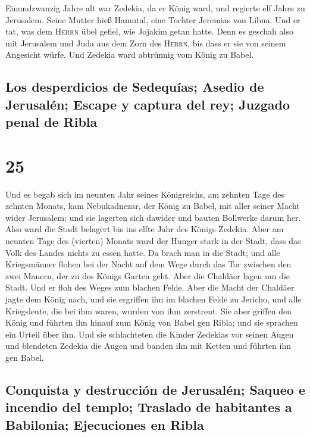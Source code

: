  Einundzwanzig Jahre alt war Zedekia, da er König ward,
und regierte elf Jahre zu Jerusalem. Seine Mutter hieß Hamutal, eine
Tochter Jeremias von Libna.  Und er tat, was dem
\textsc{Herrn} übel gefiel, wie Jojakim getan hatte. 
Denn es geschah also mit Jerusalem und Juda aus dem Zorn des
\textsc{Herrn}, bis dass er sie von seinem Angesicht würfe. Und Zedekia
ward abtrünnig vom König zu Babel.

\hypertarget{los-desperdicios-de-sedequuxedas-asedio-de-jerusaluxe9n-escape-y-captura-del-rey-juzgado-penal-de-ribla}{%
\subsection{Los desperdicios de Sedequías; Asedio de Jerusalén; Escape y
captura del rey; Juzgado penal de
Ribla}\label{los-desperdicios-de-sedequuxedas-asedio-de-jerusaluxe9n-escape-y-captura-del-rey-juzgado-penal-de-ribla}}

\hypertarget{section-24}{%
\section{25}\label{section-24}}

 Und es begab sich im neunten Jahr seines Königreichs, am
zehnten Tage des zehnten Monats, kam Nebukadnezar, der König zu Babel,
mit aller seiner Macht wider Jerusalem; und sie lagerten sich dawider
und bauten Bollwerke darum her.  Also ward die Stadt
belagert bis ins elfte Jahr des Königs Zedekia.  Aber am
neunten Tage des (vierten) Monats ward der Hunger stark in der Stadt,
dass das Volk des Landes nichts zu essen hatte.  Da brach
man in die Stadt; und alle Kriegsmänner flohen bei der Nacht auf dem
Wege durch das Tor zwischen den zwei Mauern, der zu des Königs Garten
geht. Aber die Chaldäer lagen um die Stadt. Und er floh des Weges zum
blachen Felde.  Aber die Macht der Chaldäer jagte dem
König nach, und sie ergriffen ihn im blachen Felde zu Jericho, und alle
Kriegsleute, die bei ihm waren, wurden von ihm zerstreut. 
Sie aber griffen den König und führten ihn hinauf zum König von Babel
gen Ribla; und sie sprachen ein Urteil über ihn.  Und sie
schlachteten die Kinder Zedekias vor seinen Augen und blendeten Zedekia
die Augen und banden ihn mit Ketten und führten ihn gen Babel.

\hypertarget{conquista-y-destrucciuxf3n-de-jerusaluxe9n-saqueo-e-incendio-del-templo-traslado-de-habitantes-a-babilonia-ejecuciones-en-ribla}{%
\subsection{Conquista y destrucción de Jerusalén; Saqueo e incendio del
templo; Traslado de habitantes a Babilonia; Ejecuciones en
Ribla}\label{conquista-y-destrucciuxf3n-de-jerusaluxe9n-saqueo-e-incendio-del-templo-traslado-de-habitantes-a-babilonia-ejecuciones-en-ribla}}

